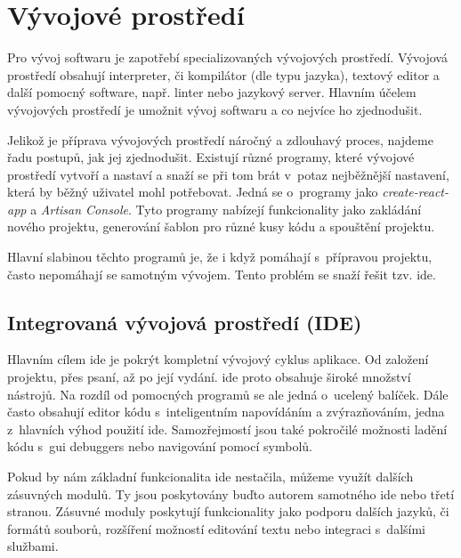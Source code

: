\section{Vývojové prostředí}
\label{sub:development-enviroment}

Pro vývoj softwaru je zapotřebí specializovaných vývojových prostředí. Vývojová prostředí obsahují interpreter, či kompilátor (dle typu jazyka)\cite{interpreter-vs-compiler}, textový editor a další pomocný software, např. linter\cite{linter} nebo jazykový server\cite{language-server}. Hlavním účelem vývojových prostředí je umožnit vývoj softwaru a co nejvíce ho zjednodušit. 

Jelikož je příprava vývojových prostředí náročný a zdlouhavý proces, najdeme řadu postupů, jak jej zjednodušit. Existují různé programy, které vývojové prostředí vytvoří a nastaví a snaží se při tom brát v~potaz nejběžnější nastavení, která by běžný uživatel mohl potřebovat. Jedná se o~programy jako \emph{create-react-app}\cite{create-react-app} a \emph{Artisan Console}\cite{laravel-artisan}. Tyto programy nabízejí funkcionality jako zakládání nového projektu, generování šablon pro různé kusy kódu a spouštění projektu.

Hlavní slabinou těchto programů je, že i když pomáhají s~přípravou projektu, často nepomáhají se samotným vývojem. Tento problém se snaží řešit tzv. \acrfull{ide}\cite{ide}.  

\subsection{Integrovaná vývojová prostředí (IDE)}

Hlavním cílem \acrshort{ide} je pokrýt kompletní vývojový cyklus aplikace. Od založení projektu, přes psaní, až po její vydání.
\acrshort{ide} proto obsahuje široké množství nástrojů.
Na rozdíl od pomocných programů se ale jedná o~ucelený balíček.
Dále často obsahují editor kódu s~inteligentním napovídáním a zvýrazňováním, jedna z~hlavních výhod použití \acrshort{ide}.
Samozřejmostí jsou také pokročilé možnosti ladění kódu s~\acrshort{gui} \glspl{debugger} nebo navigování pomocí symbolů.

Pokud by nám základní funkcionalita \acrshort{ide} nestačila, můžeme využít dalších zásuvných modulů.
Ty jsou poskytovány buďto autorem samotného \acrshort{ide} nebo třetí stranou.
Zásuvné moduly poskytují funkcionality jako podporu dalších jazyků, či formátů souborů, rozšíření možností editování textu nebo integraci s~dalšími službami.
